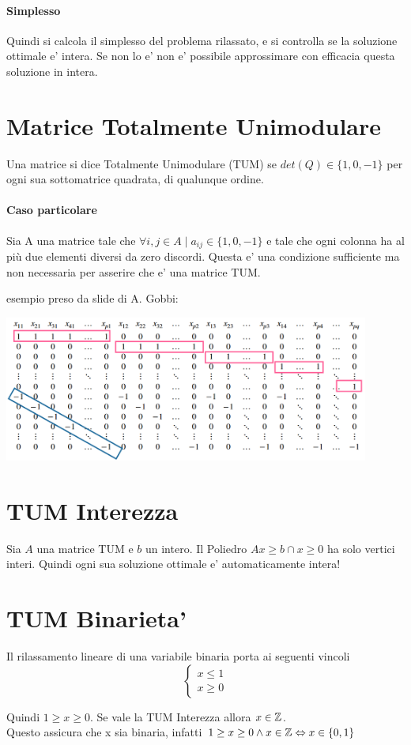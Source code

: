 \paragraph{Simplesso}

Quindi si calcola il simplesso del problema rilassato, e si controlla se la soluzione ottimale e' intera. Se non lo e' non e' possibile approssimare con efficacia questa soluzione in intera.

\section{Matrice Totalmente Unimodulare}

Una matrice si dice Totalmente Unimodulare (TUM) se $det(Q) \in \{1,0,-1\}$ per ogni sua sottomatrice quadrata, di qualunque ordine.

\paragraph{Caso particolare}

Sia A una matrice tale che $\forall i,j \in A \mid a_{ij} \in \{1,0,-1\}$ e tale che ogni colonna ha al più due elementi diversi da zero discordi.
Questa e' una condizione sufficiente ma non necessaria per asserire che e' una matrice TUM.

esempio preso da slide di A. Gobbi:

\begin{center}
    \includegraphics[width=12cm]{images/teoria/programmazione-lineare-mista/TUM.png}
\end{center}

\section{TUM Interezza}

Sia $A$ una matrice TUM e $b$ un intero. Il Poliedro $Ax \geq b \cap x \geq 0$ ha solo vertici interi.
Quindi ogni sua soluzione ottimale e' automaticamente intera!

\section{TUM Binarieta'}

Il rilassamento lineare di una variabile binaria porta ai seguenti vincoli
\[
    \begin{cases}
        x \leq 1 \\
        x \geq 0
    \end{cases}
\]

Quindi $1 \geq x \geq 0$. Se vale la TUM Interezza allora $x \in \mathbb{Z}$. \\
Questo assicura che x sia binaria, infatti $1 \geq x \geq 0 \land x \in \mathbb{Z} \Leftrightarrow x \in \{0,1\}$
